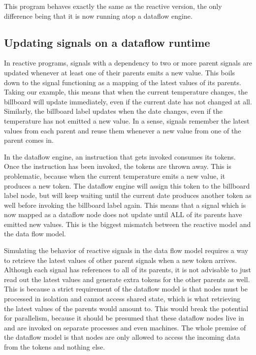 This program behaves exactly the same as the reactive version, the only difference being that it is now running atop a dataflow engine.

\subsection{Updating signals on a dataflow runtime}

In reactive programs, signals with a dependency to two or more parent signals are updated whenever at least one of their parents emits a new value. This boils down to the signal functioning as a mapping of the latest values of its parents. Taking our example, this means that when the current temperature changes, the billboard will update immediately, even if the current date has not changed at all.
Similarly, the billboard label updates when the date changes, even if the temperature has not emitted a new value. In a sense, signals remember the latest values from each parent and reuse them whenever a new value from one of the parent comes in.

In the dataflow engine, an instruction that gets invoked consumes its tokens. Once the instruction has been invoked, the tokens are thrown away. This is problematic, because when the current temperature emits a new value, it produces a new token. The dataflow engine will assign this token to the billboard label node, but will keep waiting until the current date produces another token as well before invoking the billboard label again. This means that a signal which is now mapped as a dataflow node does not update until ALL of its parents have emitted new values. This is the biggest mismatch between the reactive model and the data flow model.

Simulating the behavior of reactive signals in the data flow model requires a way to retrieve the latest values of other parent signals when a new token arrives. 
Although each signal has references to all of its parents, it is not advisable to just read out the latest values and generate extra tokens for the other parents as well. This is because a strict requirement of the dataflow model is that nodes must be processed in isolation and cannot access shared state, which is what retrieving the latest values of the parents would amount to.  
This would break the potential for parallelism, because it should be presumed that these dataflow nodes live in and are invoked on separate processes and even machines. The whole premise of the dataflow model is that nodes are only allowed to access the incoming data from the tokens and nothing else.

